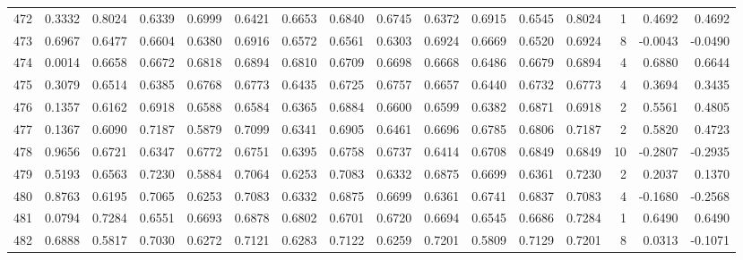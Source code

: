 \begin{tabular}{lrrrrrrrrrrrrrrr}
472 &      0.3332 &  0.8024 &  0.6339 &  0.6999 &  0.6421 &  0.6653 &  0.6840 &  0.6745 &  0.6372 &  0.6915 &   0.6545 &     0.8024 &      1 &                    0.4692 &                     0.4692 \\
473 &      0.6967 &  0.6477 &  0.6604 &  0.6380 &  0.6916 &  0.6572 &  0.6561 &  0.6303 &  0.6924 &  0.6669 &   0.6520 &     0.6924 &      8 &                   -0.0043 &                    -0.0490 \\
474 &      0.0014 &  0.6658 &  0.6672 &  0.6818 &  0.6894 &  0.6810 &  0.6709 &  0.6698 &  0.6668 &  0.6486 &   0.6679 &     0.6894 &      4 &                    0.6880 &                     0.6644 \\
475 &      0.3079 &  0.6514 &  0.6385 &  0.6768 &  0.6773 &  0.6435 &  0.6725 &  0.6757 &  0.6657 &  0.6440 &   0.6732 &     0.6773 &      4 &                    0.3694 &                     0.3435 \\
476 &      0.1357 &  0.6162 &  0.6918 &  0.6588 &  0.6584 &  0.6365 &  0.6884 &  0.6600 &  0.6599 &  0.6382 &   0.6871 &     0.6918 &      2 &                    0.5561 &                     0.4805 \\
477 &      0.1367 &  0.6090 &  0.7187 &  0.5879 &  0.7099 &  0.6341 &  0.6905 &  0.6461 &  0.6696 &  0.6785 &   0.6806 &     0.7187 &      2 &                    0.5820 &                     0.4723 \\
478 &      0.9656 &  0.6721 &  0.6347 &  0.6772 &  0.6751 &  0.6395 &  0.6758 &  0.6737 &  0.6414 &  0.6708 &   0.6849 &     0.6849 &     10 &                   -0.2807 &                    -0.2935 \\
479 &      0.5193 &  0.6563 &  0.7230 &  0.5884 &  0.7064 &  0.6253 &  0.7083 &  0.6332 &  0.6875 &  0.6699 &   0.6361 &     0.7230 &      2 &                    0.2037 &                     0.1370 \\
480 &      0.8763 &  0.6195 &  0.7065 &  0.6253 &  0.7083 &  0.6332 &  0.6875 &  0.6699 &  0.6361 &  0.6741 &   0.6837 &     0.7083 &      4 &                   -0.1680 &                    -0.2568 \\
481 &      0.0794 &  0.7284 &  0.6551 &  0.6693 &  0.6878 &  0.6802 &  0.6701 &  0.6720 &  0.6694 &  0.6545 &   0.6686 &     0.7284 &      1 &                    0.6490 &                     0.6490 \\
482 &      0.6888 &  0.5817 &  0.7030 &  0.6272 &  0.7121 &  0.6283 &  0.7122 &  0.6259 &  0.7201 &  0.5809 &   0.7129 &     0.7201 &      8 &                    0.0313 &                    -0.1071 \\

\end{tabular}
